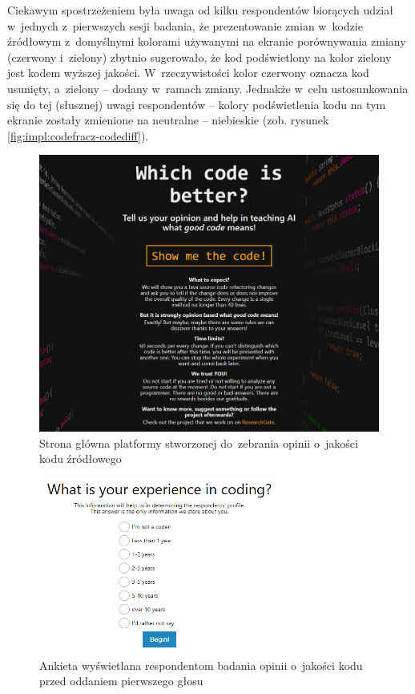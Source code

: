 \documentclass[twoside]{praca}
\begin{document}
Ciekawym spostrzeżeniem była uwaga od kilku respondentów biorących udział w~jednych z~pierwszych sesji badania, że prezentowanie zmian w~kodzie źródłowym z~domyślnymi kolorami używanymi na ekranie porównywania zmiany (czerwony i~zielony) zbytnio sugerowało, że kod podświetlony na kolor zielony jest kodem wyższej jakości. W~rzeczywistości kolor czerwony oznacza kod usunięty, a~zielony -- dodany w~ramach zmiany. Jednakże w~celu ustosunkowania się do tej (słusznej) uwagi respondentów -- kolory podświetlenia kodu na tym ekranie zostały zmienione na neutralne -- niebieskie (zob. rysunek \ref{fig:impl:codefracz-codediff}).

\begin{figure}
\centering
\includegraphics[width=\textwidth]{impl/codefracz-front.png}
\caption{Strona główna platformy stworzonej do~zebrania opinii o~jakości kodu źródłowego}
\label{fig:impl:codefracz-front}
\end{figure}

\begin{figure}
\centering
\includegraphics[width=0.7\textwidth]{impl/codefracz-ankieta.png}
\caption{Ankieta wyświetlana respondentom badania opinii o~jakości kodu przed oddaniem pierwszego głosu}
\label{fig:impl:codefracz-ankieta}
\end{figure}
\end{document}
